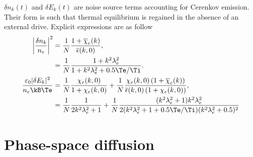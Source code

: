 \documentclass[10pt,a4paper]{article}
\def\dnk{\delta n_k}
\def\dEk{\delta E_k}
\begin{document}
$\dnk(t)$ and $\dEk(t)$ are noise source terms accounting
for Cerenkov emission. Their form is such that thermal equilibrium is
regained in the absence of an external drive. Explicit expressions
are as follow
\begin{align}
\left|\frac{\dnk}{n_e}\right|^2&=\frac{1}{N}\frac{1+\overline{\chi}_e(k)}
{\overline{\epsilon}(k,0)},\nonumber\\
&=\frac{1}{N}\frac{1+k^2\lambda_e^2}{1+k^2\lambda_e^2+0.5\Te/\Ti}.\\
\frac{\varepsilon_0|\dEk|^2}{n_e\kB\Te}&=\frac{1}{N}\frac{{\chi}_e(k,0)}{
1+{\chi}_e(k,0)}+\frac{1}{N}\frac{{\chi}_e(k,0)
\left(1+\overline{\chi}_e(k)\right)}{
\overline{\epsilon}(k,0)\left(1+{\chi}_e(k,0)\right)},\nonumber\\
&=\frac{1}{N}\frac{1}{2k^2\lambda_e^2+1}+\frac{1}{N}
\frac{(k^2\lambda_e^2+1)k^2\lambda_e^2}{2(k^2\lambda_e^2+1+0.5\Te/\Ti)
(k^2\lambda_e^2+0.5)^2}
\end{align}

\section{Phase-space diffusion}
\end{document}
